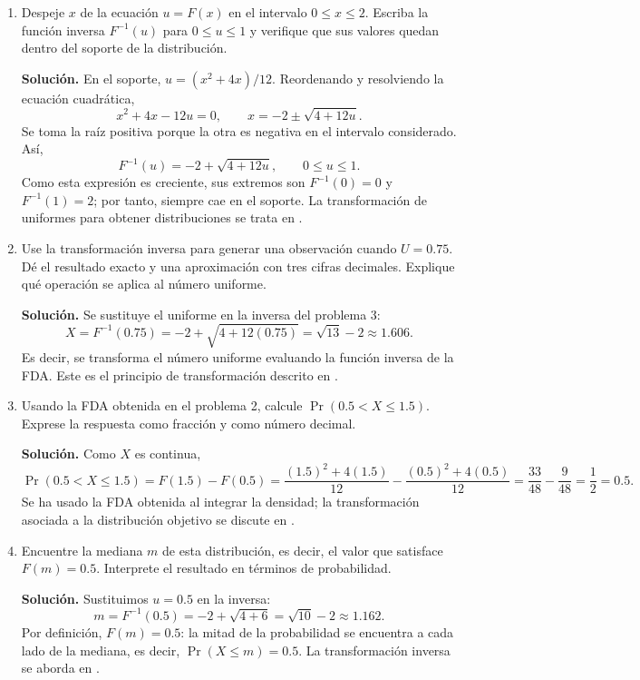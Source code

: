 \documentclass[11pt]{article}
\begin{document}
\begin{enumerate}
    \item Despeje $x$ de la ecuación $u=F(x)$ en el intervalo $0\leq x\leq2$.
    Escriba la función inversa $F^{-1}(u)$ para $0\leq u\leq1$ y verifique
    que sus valores quedan dentro del soporte de la distribución.

    \textbf{Solución.} En el soporte, $u=(x^2+4x)/12$. Reordenando y
    resolviendo la ecuación cuadrática,
    \[
        x^2+4x-12u=0,
        \qquad x=-2\pm\sqrt{4+12u}.
    \]
    Se toma la raíz positiva porque la otra es negativa en el intervalo
    considerado. Así,
    \[
        F^{-1}(u)=-2+\sqrt{4+12u},\qquad 0\leq u\leq1.
    \]
    Como esta expresión es creciente, sus extremos son $F^{-1}(0)=0$ y
    $F^{-1}(1)=2$; por tanto, siempre cae en el soporte. La transformación de
    uniformes para obtener distribuciones se trata en
    \cite[Sec.~7.2]{press1992numerical}.

    \item Use la transformación inversa para generar una observación cuando
    $U=0.75$. Dé el resultado exacto y una aproximación con tres cifras
    decimales. Explique qué operación se aplica al número uniforme.

    \textbf{Solución.} Se sustituye el uniforme en la inversa del problema 3:
    \[
        X=F^{-1}(0.75)=-2+\sqrt{4+12(0.75)}
        =\sqrt{13}-2\approx1.606.
    \]
    Es decir, se transforma el número uniforme evaluando la función inversa de
    la FDA. Este es el principio de transformación descrito en
    \cite[Sec.~7.2]{press1992numerical}.

    \item Usando la FDA obtenida en el problema 2, calcule
    $\Pr(0.5<X\leq1.5)$. Exprese la respuesta como fracción y como número
    decimal.

    \textbf{Solución.} Como $X$ es continua,
    \[
        \Pr(0.5<X\leq1.5)=F(1.5)-F(0.5)
        =\frac{(1.5)^2+4(1.5)}{12}
         -\frac{(0.5)^2+4(0.5)}{12}
        =\frac{33}{48}-\frac{9}{48}
        =\frac12=0.5.
    \]
    Se ha usado la FDA obtenida al integrar la densidad; la transformación
    asociada a la distribución objetivo se discute en
    \cite[Sec.~7.2]{press1992numerical}.

    \item Encuentre la mediana $m$ de esta distribución, es decir, el valor que
    satisface $F(m)=0.5$. Interprete el resultado en términos de probabilidad.

    \textbf{Solución.} Sustituimos $u=0.5$ en la inversa:
    \[
        m=F^{-1}(0.5)=-2+\sqrt{4+6}=\sqrt{10}-2
        \approx1.162.
    \]
    Por definición, $F(m)=0.5$: la mitad de la probabilidad se encuentra a
    cada lado de la mediana, es decir, $\Pr(X\leq m)=0.5$. La transformación
    inversa se aborda en \cite[Sec.~7.2]{press1992numerical}.


\end{enumerate}
\end{document}
